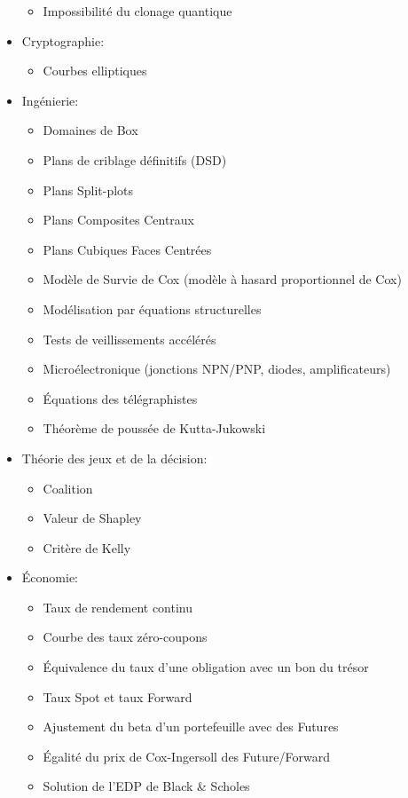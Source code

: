 \begin{itemize}
\begin{itemize}
				\item Impossibilité du clonage quantique
			\end{itemize}
		\item Cryptographie: 
			\begin{itemize}
				\item Courbes elliptiques
			\end{itemize}	
		\item Ingénierie:
			\begin{itemize}
				\item Domaines de Box
				\item Plans de criblage définitifs (DSD)
				\item Plans Split-plots
				\item Plans Composites Centraux
				\item Plans Cubiques Faces Centrées
				\item Modèle de Survie de Cox (modèle à hasard proportionnel de Cox)
				\item Modélisation par équations structurelles				
				\item Tests de veillissements accélérés
				\item Microélectronique (jonctions NPN/PNP, diodes, amplificateurs)
				\item Équations des télégraphistes
				\item Théorème de poussée de Kutta-Jukowski
			\end{itemize} 
		\item Théorie des jeux et de la décision: 
			\begin{itemize}
				\item Coalition
				\item Valeur de Shapley
				\item Critère de Kelly 
			\end{itemize}
		\item Économie: 
			\begin{itemize}
				\item Taux de rendement continu
				\item Courbe des taux zéro-coupons
				\item Équivalence du taux d'une obligation avec un bon du trésor
				\item Taux Spot et taux Forward
				\item Ajustement du beta d'un portefeuille avec des Futures
				\item Égalité du prix de Cox-Ingersoll des Future/Forward
				\item Solution de l'EDP de Black \& Scholes

\end{itemize}
\end{itemize}
